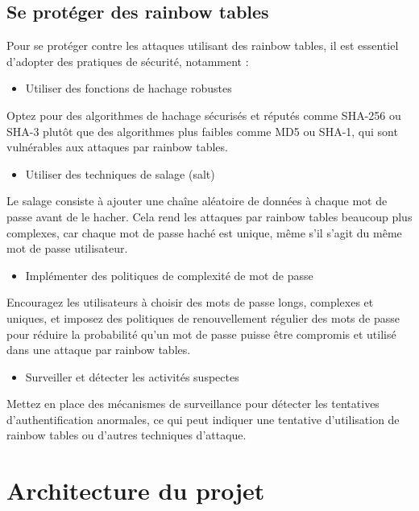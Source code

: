 \documentclass[a4paper,12pt]{article}
\begin{document}
\subsection{Se protéger des rainbow tables}
Pour se protéger contre les attaques utilisant des rainbow tables, il est essentiel d'adopter des pratiques de sécurité, notamment :\newline
\begin{itemize}
    \item Utiliser des fonctions de hachage robustes
\end{itemize}
Optez pour des algorithmes de hachage sécurisés et réputés comme SHA-256 ou SHA-3 plutôt que des algorithmes plus faibles comme MD5 ou SHA-1, qui sont vulnérables aux attaques par rainbow tables.\newline
\begin{itemize}
    \item Utiliser des techniques de salage (salt)
\end{itemize}
Le salage consiste à ajouter une chaîne aléatoire de données à chaque mot de passe avant de le hacher. Cela rend les attaques par rainbow tables beaucoup plus complexes, car chaque mot de passe haché est unique, même s'il s'agit du même mot de passe utilisateur.\newline
\begin{itemize}
    \item Implémenter des politiques de complexité de mot de passe
\end{itemize} 
Encouragez les utilisateurs à choisir des mots de passe longs, complexes et uniques, et imposez des politiques de renouvellement régulier des mots de passe pour réduire la probabilité qu'un mot de passe puisse être compromis et utilisé dans une attaque par rainbow tables.\newline
\begin{itemize}
    \item Surveiller et détecter les activités suspectes
\end{itemize}
Mettez en place des mécanismes de surveillance pour détecter les tentatives d'authentification anormales, ce qui peut indiquer une tentative d'utilisation de rainbow tables ou d'autres techniques d'attaque.

\section{Architecture du projet}
\end{document}
